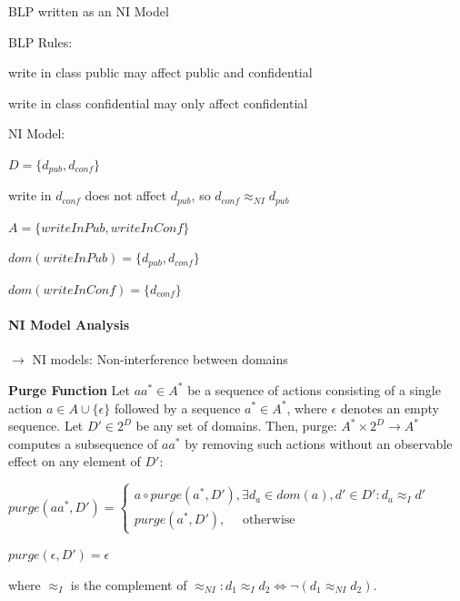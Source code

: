 \documentclass[a4paper]{article}
\renewcommand{\note}[2]{\begin{noteBox} \textbf{#1} #2 \end{noteBox}}
\begin{document}
\begin{multicols}{3}
    BLP written as an NI Model
    \begin{itemize*}
        \item BLP Rules:
        \begin{itemize*}
            \item write in class public may affect public and confidential
            \item write in class confidential may only affect confidential
        \end{itemize*}
        \item NI Model:
        \begin{itemize*}
            \item $D=\{d_{pub},d_{conf}\}$
            \item write in $d_{conf}$ does not affect $d_{pub}$, so $d_{conf} \approx_{NI} d_{pub}$
            \item $A=\{writeInPub, writeInConf\}$
            \item $dom(writeInPub)=\{d_{pub},d_{conf}\}$
            \item $dom(writeInConf)=\{d_{conf}\}$
        \end{itemize*}
    \end{itemize*}

    \paragraph{NI Model Analysis}
    \begin{itemize*}
        \item[$\rightarrow$] NI models: Non-interference between domains
    \end{itemize*}

    \note{Purge Function}{Let $aa^*\in A^*$ be a sequence of actions consisting of a single action $a\in A\cup\{\epsilon\}$ followed by a sequence $a^*\in A^*$, where $\epsilon$ denotes an empty sequence. Let $D'\in 2^D$ be any set of domains. Then, purge: $A^*\times 2^D \rightarrow A^*$ computes a subsequence of $aa^*$ by removing such actions without an observable effect on any element of $D':$
        \begin{itemize*}
            \item $purge(aa^*,D')=\begin{cases} a\circ purge(a^*,D'), \exists d_a\in dom(a),d'\in D':d_a\approx_I d' \\ purge(a^*,D'), \quad\text{ otherwise }\end{cases}$
            \item $purge(\epsilon,D')=\epsilon$
        \end{itemize*}
        where $\approx_I$ is the complement of $\approx_{NI}:d_1 \approx_I d_2\Leftrightarrow \lnot(d_1 \approx_{NI} d_2)$.
    }


\end{multicols}
\end{document}
